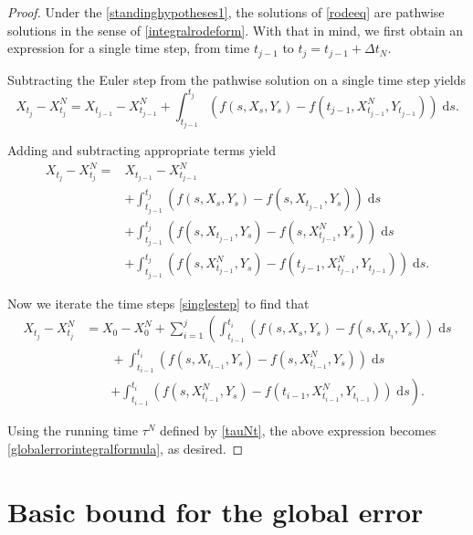 \documentclass[reqno,12pt]{amsart}
\theoremstyle{plain} %
\theoremstyle{definition} %
\begin{document}
\begin{proof}
    Under the \cref{standinghypotheses1}, the solutions of \cref{rodeeq} are pathwise solutions in the sense of \cref{integralrodeform}. With that in mind, we first obtain an expression for a single time step, from time $t_{j-1}$ to $t_j = t_{j-1} + \Delta t_N$.
    
    Subtracting the Euler step from the pathwise solution on a single time step yields
    $$
    X_{t_j} - X_{t_j}^N = X_{t_{j-1}} - X_{t_{j-1}}^N + \int_{t_{j-1}}^{t_j} \left( f(s, X_s, Y_s) - f(t_{j-1}, X_{t_{j-1}}^N, Y_{t_{j-1}}) \right)\;\mathrm{d}s.
    $$

    Adding and subtracting appropriate terms yield
    \begin{equation}
        \label{singlestep}
        \begin{aligned}
            X_{t_j} - X_{t_j}^N  = & X_{t_{j-1}} - X_{t_{j-1}}^N \\
            & + \int_{t_{j-1}}^{t_j} \left( f(s, X_s, Y_s) - f(s, X_{t_{j-1}}, Y_s) \right)\;\mathrm{d}s \\ 
            & + \int_{t_{j-1}}^{t_j} \left( f(s, X_{t_{j-1}}, Y_s) - f(s, X_{t_{j-1}}^N, Y_s) \right)\;\mathrm{d}s \\
            & + \int_{t_{j-1}}^{t_j} \left( f(s, X_{t_{j-1}}^N, Y_s) - f(t_{j-1}, X_{t_{j-1}}^N, Y_{t_{j-1}}) \right)\;\mathrm{d}s.
        \end{aligned}
    \end{equation}

    Now we iterate the time steps \cref{singlestep} to find that
    \begin{align*}
        X_{t_j} - X_{t_j}^N & = X_0 - X_0^N + \sum_{i=1}^{j} \left(\int_{t_{i-1}}^{t_i} \left( f(s, X_s, Y_s) - f(s, X_{t_{i}}, Y_s) \right)\;\mathrm{d}s \right. \\ 
        & \qquad + \int_{t_{i-1}}^{t_i} \left( f(s, X_{t_{i-1}}, Y_s) - f(s, X_{t_{i-1}}^N, Y_s) \right)\;\mathrm{d}s \\
        & \qquad \left. + \int_{t_{i-1}}^{t_i} \left( f(s, X_{t_{i-1}}^N, Y_s) - f(t_{i-1}, X_{t_{i-1}}^N, Y_{t_{i-1}}) \right)\;\mathrm{d}s \right).
    \end{align*}

    Using the running time $\tau^N$ defined by \cref{tauNt}, the above expression becomes \cref{globalerrorintegralformula}, as desired.
\end{proof}

\section{Basic bound for the global error}
\end{document}
